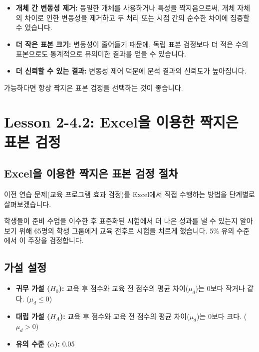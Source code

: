 \documentclass[11pt,a4paper]{article}
\theoremstyle{definition}
\begin{document}
\begin{summarybox}[title=짝지은 표본 검정의 장점]
\begin{itemize}
    \item \textbf{개체 간 변동성 제거:} 동일한 개체를 사용하거나 특성을 짝지음으로써, 개체 자체의 차이로 인한 변동성을 제거하고 두 처리 또는 시점 간의 순수한 차이에 집중할 수 있습니다.
    \item \textbf{더 작은 표본 크기:} 변동성이 줄어들기 때문에, 독립 표본 검정보다 더 적은 수의 표본으로도 통계적으로 유의미한 결과를 얻을 수 있습니다.
    \item \textbf{더 신뢰할 수 있는 결과:} 변동성 제어 덕분에 분석 결과의 신뢰도가 높아집니다.
\end{itemize}
가능하다면 항상 짝지은 표본 검정을 선택하는 것이 좋습니다.
\end{summarybox}

\newpage
\section{Lesson 2-4.2: Excel을 이용한 짝지은 표본 검정}

\subsection{Excel을 이용한 짝지은 표본 검정 절차}
이전 연습 문제(교육 프로그램 효과 검정)를 Excel에서 직접 수행하는 방법을 단계별로 살펴보겠습니다.

\begin{examplebox}[title=시나리오:]
학생들이 준비 수업을 이수한 후 표준화된 시험에서 더 나은 성과를 낼 수 있는지 알아보기 위해 65명의 학생 그룹에게 교육 전후로 시험을 치르게 했습니다. 5\% 유의 수준에서 이 주장을 검정합니다.
\end{examplebox}

\subsection{가설 설정}
\begin{itemize}
    \item \textbf{귀무 가설 ($H_0$):} 교육 후 점수와 교육 전 점수의 평균 차이($\mu_d$)는 0보다 작거나 같다. ($\mu_d \le 0$)
    \item \textbf{대립 가설 ($H_A$):} 교육 후 점수와 교육 전 점수의 평균 차이($\mu_d$)는 0보다 크다. ($\mu_d > 0$)
    \item \textbf{유의 수준 ($\alpha$):} 0.05
\end{itemize}
\end{document}
